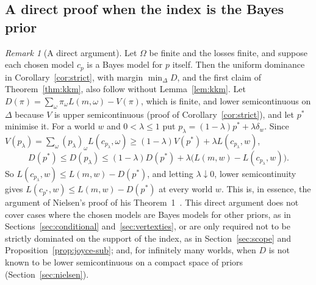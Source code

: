 \documentclass[11pt]{article}
\theoremstyle{definition}
\theoremstyle{remark}
\newtheorem{remark}[theorem]{Remark}
\begin{document}
\subsection{A direct proof when the index is the Bayes prior}\label{sec:direct}
\begin{remark}[A direct argument]\label{rem:direct}
Let $\Omega$ be finite and the losses finite, and suppose each chosen model $c_p$ is a Bayes model for $p$ itself. Then the uniform dominance in Corollary~\ref{cor:strict}, with margin $\min_\Delta D$, and the first claim of Theorem~\ref{thm:kkm}, also follow without Lemma~\ref{lem:kkm}. Let $D(\pi)=\sum_\omega\pi_\omega L(m,\omega)-V(\pi)$, which is finite, and lower semicontinuous on $\Delta$ because $V$ is upper semicontinuous (proof of Corollary~\ref{cor:strict}), and let $p^*$ minimise it. For a world $w$ and $0<\lambda\le1$ put $p_\lambda=(1-\lambda)p^*+\lambda\delta_w$. Since $V(p_\lambda)=\sum_\omega(p_\lambda)_\omega L(c_{p_\lambda},\omega)\ge(1-\lambda)V(p^*)+\lambda L(c_{p_\lambda},w)$,
\[
 D(p^*)\le D(p_\lambda)\le(1-\lambda)D(p^*)+\lambda\bigl(L(m,w)-L(c_{p_\lambda},w)\bigr).
\]
So $L(c_{p_\lambda},w)\le L(m,w)-D(p^*)$, and letting $\lambda\downarrow0$, lower semicontinuity gives $L(c_{p^*},w)\le L(m,w)-D(p^*)$ at every world $w$. This is, in essence, the argument of Nielsen's proof of his Theorem~1~\cite[Appendix~C]{Nielsen}. This direct argument does not cover cases where the chosen models are Bayes models for other priors, as in Sections~\ref{sec:conditional} and~\ref{sec:vertexties}, or are only required not to be strictly dominated on the support of the index, as in Section~\ref{sec:scope} and Proposition~\ref{prop:joyce-sub}; and, for infinitely many worlds, when $D$ is not known to be lower semicontinuous on a compact space of priors (Section~\ref{sec:nielsen}).
\end{remark}
\end{document}
